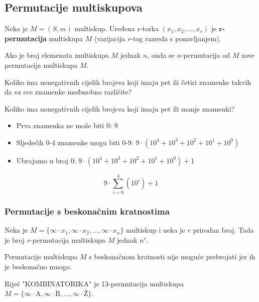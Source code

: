 \subsection{Permutacije multiskupova}

Neka je $M = (S, m)$ multiskup. Uređena r-torka $(x_1, x_2, \dots, x_r)$ je
\textbf{$\mathbf{r}$-permutacija} multiskupa $M$ (varijacija $r$-tog razreda s
ponavljanjem).

Ako je broj elemenata multiskupa $M$ jednak $n$, onda se $n$-permutacija od $M$
zove permutacija multiskupa $M$.

\begin{problem}
    Koliko ima nenegativnih cijelih brojeva koji imaju pet ili četiri znamenke
    takvih da su sve znamenke međusobno različite?
\end{problem}

\begin{problem}
    Koliko ima nenegativnih cijelih brojeva koji imaju pet ili manje znamenki?
\end{problem}

\begin{itemize}
    \item Prva znamenka ne može biti $0$: $9$
    \item Sljedećih 0-4 znamenke mogu biti 0-9: $9 \cdot (10^4 + 10^3 + 10^2 + 10^1 + 10^0)$
    \item Ubrajamo u broj $0$: $9 \cdot (10^4 + 10^3 + 10^2 + 10^1 + 10^0) + 1$
\end{itemize}

$$
    9 \cdot \sum_{i=0}^{4}(10^i) + 1
$$

\subsubsection{Permutacije s beskonačnim kratnostima}

\begin{theorem}
    Neka je $M = \{\infty \cdot x_1, \infty \cdot x_2, \dots, \infty \cdot
    x_n\}$ multiskup i neka je $r$ prirodan broj. Tada je broj $r$-permutacija
    multiskupa $M$ jednak $n^r$.
\end{theorem}

\bigskip
Permutacije multiskupa $M$ s beskonačnom kratnosti nije moguće prebrojati jer ih
je beskonačno mnogo.


\begin{example}
    Riječ "KOMBINATORIKA" je 13-permutacija multiskupa $M = \{\infty \cdot
    \text{A}, \infty \cdot \text{B}, \dots, \infty \cdot \text{Ž}\}$.
\end{example}

